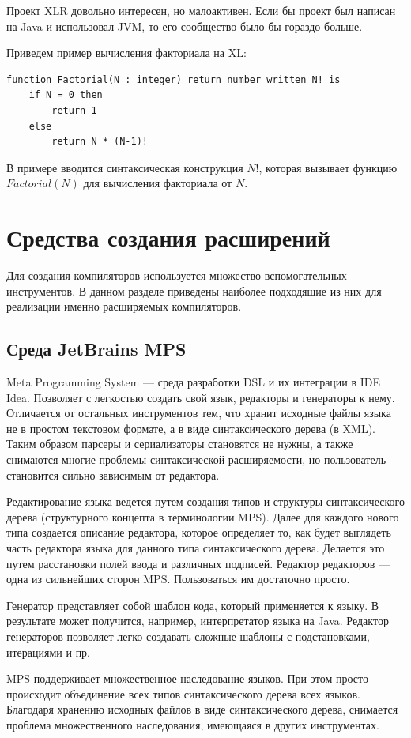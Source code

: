 \documentclass[a4paper,12pt,titlepage]{extarticle}
\begin{document}
Проект XLR довольно интересен, но малоактивен. Если бы проект был написан на
Java и использовал JVM, то его сообщество было бы гораздо больше.

Приведем пример вычисления факториала на XL:
\begin{verbatim}
function Factorial(N : integer) return number written N! is
    if N = 0 then
        return 1
    else
        return N * (N-1)!
\end{verbatim}
В примере вводится синтаксическая конструкция $N!$, которая вызывает функцию
$Factorial(N)$ для вычисления факториала от $N$.

\section{Средства создания расширений}
\label{tools}

Для создания компиляторов используется множество вспомогательных инструментов. В
данном разделе приведены наиболее подходящие из них для реализации
именно расширяемых компиляторов. 

\subsection{Среда JetBrains MPS}
Meta Programming System --- среда разработки DSL и их интеграции в IDE Idea.
Позволяет с легкостью создать свой язык, редакторы и генераторы к нему.
Отличается от остальных инструментов тем, что хранит исходные файлы языка не в
простом текстовом формате, а в виде синтаксического дерева (в XML).
Таким образом парсеры и сериализаторы становятся не нужны, а также снимаются
многие проблемы синтаксической расширяемости, но пользователь становится сильно
зависимым от редактора.

Редактирование языка ведется путем создания типов и структуры синтаксического
дерева (структурного концепта в терминологии MPS). Далее для каждого нового типа
создается описание редактора, которое определяет то, как будет выглядеть часть
редактора языка для данного типа синтаксического дерева. Делается это путем
расстановки полей ввода и различных подписей. Редактор редакторов --- одна из
сильнейших сторон MPS. Пользоваться им достаточно просто.

Генератор представляет собой шаблон кода, который применяется к языку. В
результате может получится, например, интерпретатор языка на Java. Редактор
генераторов позволяет легко создавать сложные шаблоны с подстановками,
итерациями и пр.

MPS поддерживает множественное наследование языков. При этом просто происходит 
объединение всех типов синтаксического дерева всех языков. Благодаря хранению
исходных файлов в виде синтаксического дерева, снимается проблема
множественного наследования, имеющаяся в других инструментах.
\end{document}
